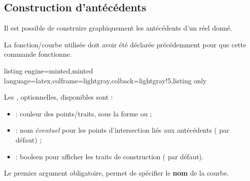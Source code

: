 \documentclass[11pt,a4paper]{ltxdoc}
\begin{document}
%
%

\pagebreak

\subsection{Construction d'antécédents}\label{tracanteced}

Il est possible de construire graphiquement les antécédents d'un réel donné.

La fonction/courbe utilisée doit avoir été déclarée précédemment pour que cette commande fonctionne.

\begin{tcblisting}{listing engine=minted,minted language=latex,colframe=lightgray,colback=lightgray!5,listing only}
\end{tcblisting}

Les \MontreCode{[clés]}, optionnelles, disponibles sont :

\smallskip

\begin{itemize}
	\item {} : couleur des points/traits, sous la forme  ou  ;
	\item {} : nom \textit{éventuel} pour les points d'intersection liés aux antécédents ( par défaut) ;
	\item {} : booleen pour afficher les traits de construction ( par défaut).
\end{itemize}

\smallskip

Le premier argument obligatoire, permet de spécifier le \textbf{nom} de la courbe.
\end{document}
